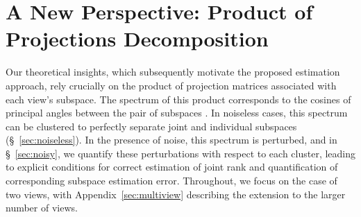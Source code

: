 \documentclass{amsart}
\begin{document}
\section{{A New Perspective: Product of Projections Decomposition}}\label{sec:theory}
Our theoretical insights, which subsequently motivate the proposed estimation approach, rely crucially on the product of projection matrices associated with each view's subspace. The spectrum of this product corresponds to the cosines of principal angles between the pair of subspaces \citep{Bjoerck1971NumericalMF}. In noiseless cases, this spectrum can be clustered to perfectly separate joint and individual subspaces (\S~\ref{sec:noiseless}). In the presence of noise, this spectrum is perturbed, and in \S~\ref{sec:noisy}, we quantify these perturbations with respect to each cluster, leading to explicit conditions for correct estimation of joint rank and quantification of corresponding subspace estimation error. Throughout, we focus on the case of two views, with Appendix~\ref{sec:multiview} describing the extension to the larger number of views. 
\end{document}
